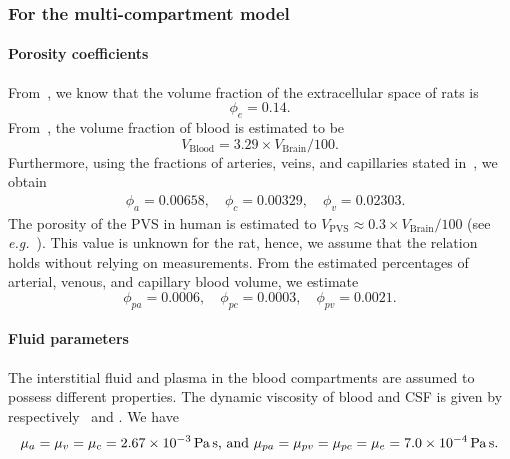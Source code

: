 \documentclass[10pt,letterpaper]{article}
\newcommand{\eg}{\emph{e.g.}\;}
\newcommand{\1}{^{(1)}}
\newcommand{\2}{^{(2)}}
\begin{document}
\subsubsection{For the multi-compartment model}

\paragraph{Porosity coefficients}
From~\cite{Cserr-1991-Extracellular}, we know that the volume fraction of the extracellular space of rats is
\[
    \phi_e = 0.14.
\]
From~\cite{Adriana-2007-MR}, the volume fraction of blood is estimated to be 
\[
    V_\text{Blood} = 3.29 \times V_\text{Brain}/100.
\]
Furthermore, using the fractions of arteries, veins, and capillaries stated in~\cite{Lee-2001-CBV}, we obtain
\[
\begin{aligned}
    &\phi_a = 0.00658, \quad \phi_c = 0.00329,\quad \phi_v = 0.02303.
\end{aligned}
\]
The porosity of the PVS in human is estimated to $V_\text{PVS} \approx 0.3\times V_\text{Brain}/100$ (see \eg~\cite{BALLERINI2020102120}). This value is unknown for the rat, hence, we assume that the relation holds without relying on measurements. 
From the estimated percentages of arterial, venous, and capillary blood volume, we estimate 
\[
    \phi_{pa} = 0.0006, \quad \phi_{pc} = 0.0003,\quad \phi_{pv} = 0.0021.
\]


\paragraph{Fluid parameters}

The interstitial fluid and plasma in the blood compartments are assumed to possess different properties. 
The dynamic viscosity of blood and CSF is given by respectively~\cite{Guo-2019-MPET} and \cite{bloomfield1998effects}. We have 
\[
    \mu_a = \mu_v = \mu_c = 2.67 \times 10^{-3} \, \text{\si{\pascal \second}, and }  \mu_{pa} = \mu_{pv} = \mu_{pc}  = \mu_e = 7.0 \times 10^{-4}\, \text{\si{\pascal \second}}.
\]

\end{document}
